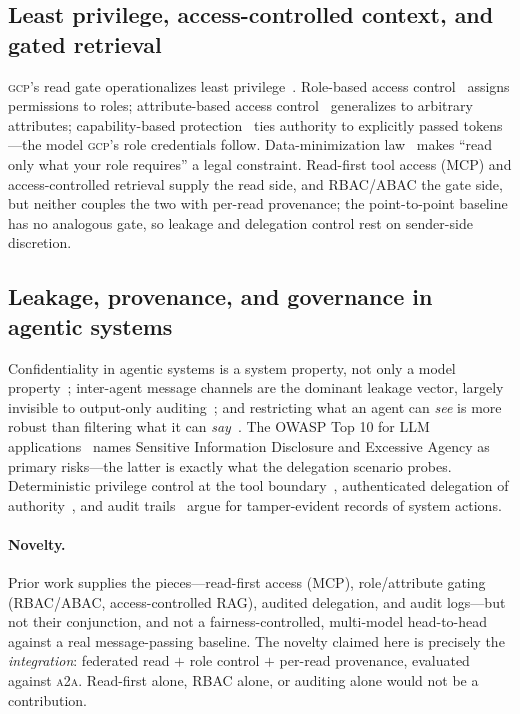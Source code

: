 \documentclass[conference,letterpaper]{IEEEtran}
\newcommand{\gcp}{\textsc{gcp}}
\newcommand{\ata}{\textsc{a2a}}
\begin{document}
\subsection{Least privilege, access-controlled context, and gated retrieval}
\gcp{}'s read gate operationalizes least privilege~\citep{saltzer1975}. Role-based access
control~\citep{sandhu1996} assigns permissions to roles; attribute-based access
control~\citep{nist800162} generalizes to arbitrary attributes; capability-based
protection~\citep{dennis1966} ties authority to explicitly passed tokens---the model \gcp{}'s role
credentials follow. Data-minimization law~\citep{gdpr2016} makes ``read only what your role
requires'' a legal constraint. Read-first tool access (MCP) and access-controlled retrieval supply
the read side, and RBAC/ABAC the gate side, but neither couples the two with per-read provenance;
the point-to-point baseline has no analogous gate, so leakage and delegation control rest on
sender-side discretion.

\subsection{Leakage, provenance, and governance in agentic systems}
Confidentiality in agentic systems is a system property, not only a model
property~\citep{evertz2024whispers}; inter-agent message channels are the dominant leakage vector,
largely invisible to output-only auditing~\citep{elyagoubi2026agentleak}; and restricting what an
agent can \emph{see} is more robust than filtering what it can \emph{say}~\citep{bagdasarian2024airgap}.
The OWASP Top 10 for LLM applications~\citep{owasp2025} names Sensitive Information Disclosure and
Excessive Agency as primary risks---the latter is exactly what the delegation scenario probes.
Deterministic privilege control at the tool boundary~\citep{shi2025progent}, authenticated
delegation of authority~\citep{south2025delegation}, and audit trails~\citep{ojewale2025audit} argue
for tamper-evident records of system actions.

\paragraph{Novelty.} Prior work supplies the pieces---read-first access (MCP),
role/attribute gating (RBAC/ABAC, access-controlled RAG), audited delegation, and audit logs---but
not their conjunction, and not a fairness-controlled, multi-model head-to-head against a real
message-passing baseline. The novelty claimed here is precisely the \emph{integration}: federated
read $+$ role control $+$ per-read provenance, evaluated against \ata{}. Read-first alone, RBAC
alone, or auditing alone would not be a contribution.
\end{document}
